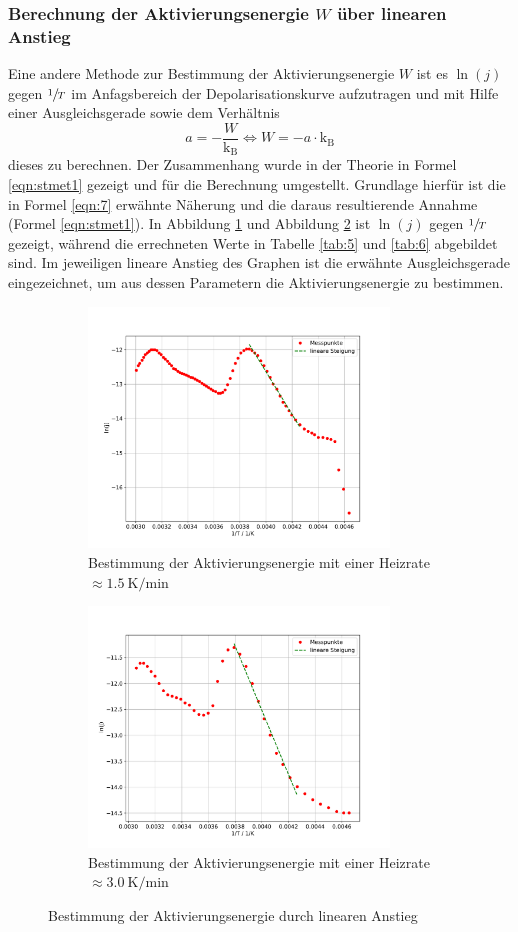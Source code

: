 \subsubsection{Berechnung der Aktivierungsenergie $W$ über linearen Anstieg}
Eine andere Methode zur Bestimmung der Aktivierungsenergie $W$ ist es $\ln(j)$
gegen $\sfrac{1}{T}$ im Anfagsbereich der Depolarisationskurve
aufzutragen und mit Hilfe einer Ausgleichsgerade sowie dem
Verhältnis
\begin{equation}
  a = -\frac{W}{\text{k}_\text{B}} \iff W = -a \cdot \text{k}_\text{B}
\end{equation}
dieses zu berechnen.
Der Zusammenhang wurde in der Theorie in Formel \ref{eqn:stmet1} gezeigt und für
die Berechnung umgestellt.
Grundlage hierfür ist die in Formel \ref{eqn:7} erwähnte Näherung und die daraus
resultierende Annahme (Formel \ref{eqn:stmet1}).
In Abbildung \ref{fig:j_1} und Abbildung \ref{fig:j_2} ist $\ln(j)$
gegen $\sfrac{1}{T}$ gezeigt, während die errechneten Werte in
Tabelle \ref{tab:5} und \ref{tab:6} abgebildet sind.
Im jeweiligen lineare Anstieg des Graphen ist die
erwähnte Ausgleichsgerade eingezeichnet, um aus dessen Parametern die
Aktivierungsenergie zu bestimmen.
\begin{figure}[H]
\centering
\begin{subfigure}{0.49\textwidth}
\centering
\includegraphics[width=8.0cm]{Messdaten_1_lnj.pdf}
\caption{Bestimmung der Aktivierungsenergie mit einer Heizrate
$\approx \SI{1.5}{\kelvin\per\minute}$}
\label{fig:j_1}
\end{subfigure}
\begin{subfigure}{0.49\textwidth}
\centering
\includegraphics[width=8.0cm]{Messdaten_2_lnj.pdf}
\caption{Bestimmung der Aktivierungsenergie mit einer Heizrate
$\approx \SI{3.0}{\kelvin\per\minute}$}
\label{fig:j_2}
\end{subfigure}
\caption{Bestimmung der Aktivierungsenergie durch linearen Anstieg}
\label{abb:j_ges}
\end{figure}
